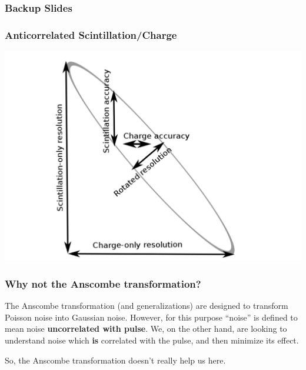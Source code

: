 \documentclass{beamer}
\begin{document}



\begin{frame}
\frametitle{Backup Slides}
\end{frame}

\begin{frame}
\begin{center}
\frametitle{Anticorrelated Scintillation/Charge}
\end{center}
\vspace{.5cm}
\begin{center}
\includegraphics[keepaspectratio=true,width=\textwidth]{RotatedIsland.png}
\end{center}
\end{frame}

\begin{frame}
\begin{center}
\frametitle{Why not the Anscombe transformation?}
\end{center}
The Anscombe transformation (and generalizations) are designed to transform Poisson noise into Gaussian noise.  However, for this purpose ``noise'' is defined to mean noise {\bf uncorrelated with pulse}.  We, on the other hand, are looking to understand noise which {\bf is} correlated with the pulse, and then minimize its effect.

So, the Anscombe transformation doesn't really help us here.
\end{frame}
\end{document}
